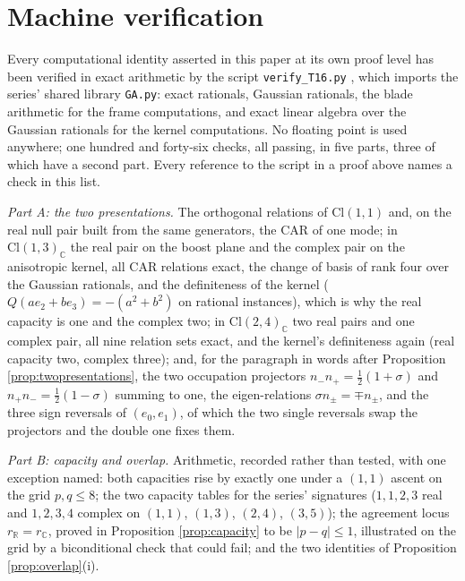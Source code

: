 \documentclass[11pt]{article}
\theoremstyle{definition}
\newcommand{\Cl}{\mathrm{Cl}}
\newcommand{\R}{\mathbb{R}}
\newcommand{\C}{\mathbb{C}}
\begin{document}
\section{Machine verification}\label{sec:verification}

Every computational identity asserted in this paper at its own proof level has been verified in exact arithmetic by the script \texttt{verify\_T16.py} \cite{ButlerVerifyT16}, which imports the series' shared library \texttt{GA.py}: exact rationals, Gaussian rationals, the blade arithmetic for the frame computations, and exact linear algebra over the Gaussian rationals for the kernel computations. No floating point is used anywhere; one hundred and forty-six checks, all passing, in five parts, three of which have a second part. Every reference to the script in a proof above names a check in this list.

\emph{Part A: the two presentations.} The orthogonal relations of $\Cl(1,1)$ and, on the real null pair built from the same generators, the CAR of one mode; in $\Cl(1,3)_{\C}$ the real pair on the boost plane and the complex pair on the anisotropic kernel, all CAR relations exact, the change of basis of rank four over the Gaussian rationals, and the definiteness of the kernel ($Q(ae_{2} + be_{3}) = -(a^{2} + b^{2})$ on rational instances), which is why the real capacity is one and the complex two; in $\Cl(2,4)_{\C}$ two real pairs and one complex pair, all nine relation sets exact, and the kernel's definiteness again (real capacity two, complex three); and, for the paragraph in words after Proposition \ref{prop:twopresentations}, the two occupation projectors $n_{-}n_{+} = \tfrac12(1+\sigma)$ and $n_{+}n_{-} = \tfrac12(1-\sigma)$ summing to one, the eigen-relations $\sigma n_{\pm} = \mp n_{\pm}$, and the three sign reversals of $(e_{0}, e_{1})$, of which the two single reversals swap the projectors and the double one fixes them.

\emph{Part B: capacity and overlap.} Arithmetic, recorded rather than tested, with one exception named: both capacities rise by exactly one under a $(1,1)$ ascent on the grid $p, q \leq 8$; the two capacity tables for the series' signatures ($1,1,2,3$ real and $1,2,3,4$ complex on $(1,1)$, $(1,3)$, $(2,4)$, $(3,5)$); the agreement locus $r_{\R} = r_{\C}$, proved in Proposition \ref{prop:capacity} to be $|p - q| \leq 1$, illustrated on the grid by a biconditional check that could fail; and the two identities of Proposition \ref{prop:overlap}(i).
\end{document}
